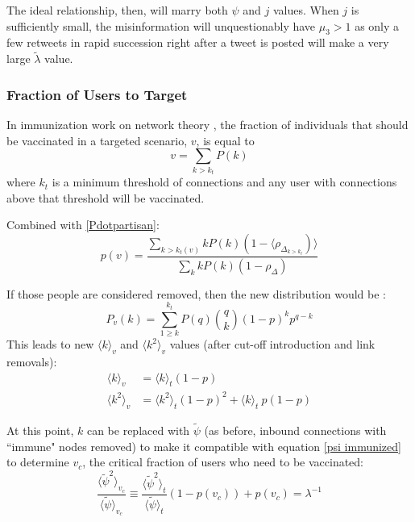\documentclass[preprint,review,12pt]{elsarticle}
\begin{document}
The ideal relationship, then, will marry both $\psi$ and $j$ values. When $j$ is sufficiently small, the misinformation will unquestionably have $\mu_3 > 1$ as only a few retweets in rapid succession right after a tweet is posted will make a very large $\tilde{\lambda}$ value.

\subsubsection{Fraction of Users to Target}
In immunization work on network theory \citep{pastor2002immunization}, the fraction of individuals that should be vaccinated in a targeted scenario, $v$, is equal to 
\begin{equation}
    v = \sum_{k > k_t}P(k)
\end{equation}
where $k_t$ is a minimum threshold of connections and any user with connections above that threshold will be vaccinated. 

Combined with \ref{Pdotpartisan}:
\begin{equation}
\label{probability of vaccinated}
p(v) = \frac{\sum_{k>k_t(v)}kP(k)(1-\langle \rho_{\Delta_{k>k_t}})\rangle}{\sum_{k}kP(k)(1-\rho_{\Delta})}
\end{equation}

If those people are considered removed, then the new distribution would be \citep{cohen2001breakdown}:
\begin{equation}
    P_v(k) = \sum_{1\geq k}^{k_t}P(q)\binom{q}{k}(1-p)^kp^{q-k}
\end{equation}
This leads to new $\langle k \rangle_v$ and $\langle k^2 \rangle_v$ values (after cut-off introduction and link removals)\citep{pastor2002immunization}: 
\begin{align*}
        \langle k \rangle_v &= \langle k \rangle_t(1-p)\\
         \langle k^2 \rangle_v &= \langle k^2 \rangle_t(1-p)^2+\langle k \rangle_t\ p(1-p)
\end{align*}

At this point, $k$ can be replaced with $\tilde{\psi}$ (as before, inbound connections with ``immune" nodes removed) to make it compatible with equation \ref{psi immunized} to determine $v_c$, the critical fraction of users who need to be vaccinated:
\begin{equation}
\label{v_c equation}
 \frac{\langle \tilde{\psi}^2 \rangle_{v_c}}{\langle \tilde{\psi} \rangle_{v_c}} \equiv \frac{\langle \tilde{\psi}^2 \rangle_{t}}{\langle \tilde{\psi} \rangle_{t}}(1-p(v_c))+p(v_c)=\lambda^{-1}
\end{equation}
\end{document}
